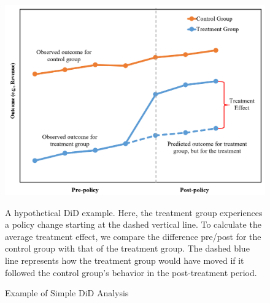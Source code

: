 \documentclass[12pt]{article}
\begin{document}
\begin{figure}[H]
    \centering
    \caption{Example of Simple DiD Analysis}
    \includegraphics[width=6in]{Figures/Diff in Diff Diagram.PNG}
    \label{fig:did-diagram}
    \vspace{5mm}
    \footnotesize \begin{singlespace*}
        \parbox{5.5in}{A hypothetical DiD example. Here, the treatment group experiences a policy change starting at the dashed vertical line. To calculate the average treatment effect, we compare the difference pre/post for the control group with that of the treatment group. The dashed blue line represents how the treatment group would have moved if it followed the control group’s behavior in the post-treatment period.}
    \end{singlespace*}
\end{figure}
\noindent
\end{document}
